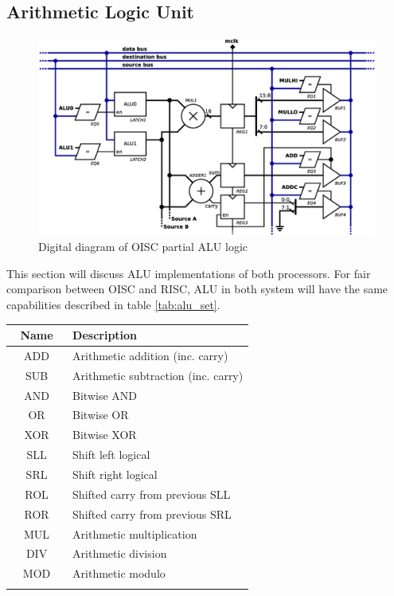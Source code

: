 \subsection{Arithmetic Logic Unit}\label{subsec:alu}

\begin{figure}[b]
\centering
\includegraphics[scale=0.35]{../resources/oisc_alu.eps}
\caption{Digital diagram of OISC partial ALU logic}
\label{fig:oisc_alu}
\end{figure}

This section will discuss ALU implementations of both processors. For fair comparison between OISC and RISC, ALU in both system will have the same capabilities described in table \ref{tab:alu_set}.

\begin{blockpage}
	\begin{tabular}{| c | p{0.75\linewidth} |} \hline 
		\rowcolor[rgb]{0.82,0.82,0.82}
		Name & Description \\\hline
		\arrayrulecolor[rgb]{0.82,0.82,0.82}
		ADD & Arithmetic addition (inc. carry) \\\hline
		SUB & Arithmetic subtraction (inc. carry) \\\hline
		AND & Bitwise AND \\\hline
		OR  & Bitwise OR \\\hline
		XOR & Bitwise XOR \\\hline
		SLL & Shift left logical \\\hline
		SRL & Shift right logical \\\hline
		ROL & Shifted carry from previous SLL \\\hline
		ROR & Shifted carry from previous SRL \\\hline
		MUL & Arithmetic multiplication \\\hline
		DIV & Arithmetic division \\\hline
		MOD & Arithmetic modulo \\
		\arrayrulecolor[rgb]{0,0,0}\hline
	\end{tabular}
	\label{tab:alu_set}
\end{blockpage}

